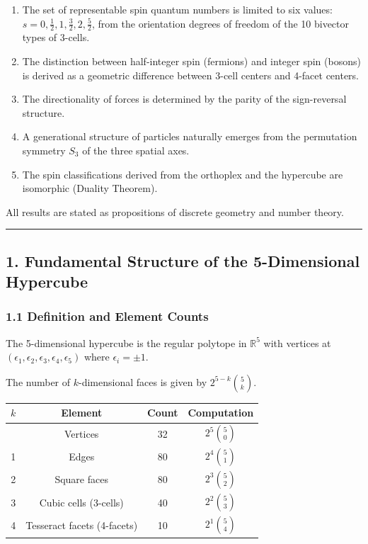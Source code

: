 \documentclass[a4paper,11pt]{article}
\providecommand{\tightlist}{\setlength{\itemsep}{0pt}\setlength{\parskip}{0pt}}
\newcounter{none}
\begin{document}
\begin{enumerate}
\def\labelenumi{\arabic{enumi}.}
\tightlist
\item
  The set of representable spin quantum numbers is limited to six values:
  $s = 0, \frac{1}{2}, 1, \frac{3}{2}, 2, \frac{5}{2}$, from the orientation degrees of freedom of the 10 bivector types of 3-cells.
\item
  The distinction between half-integer spin (fermions) and integer spin (bosons) is derived as a geometric difference between 3-cell centers and 4-facet centers.
\item
  The directionality of forces is determined by the parity of the sign-reversal structure.
\item
  A generational structure of particles naturally emerges from the permutation symmetry $S_3$ of the three spatial axes.
\item
  The spin classifications derived from the orthoplex and the hypercube are isomorphic (Duality Theorem).
\end{enumerate}

All results are stated as propositions of discrete geometry and number theory.

\begin{center}\rule{0.5\linewidth}{0.5pt}\end{center}

\subsection*{1. Fundamental Structure of the 5-Dimensional Hypercube}

\subsubsection*{1.1 Definition and Element Counts}

The 5-dimensional hypercube is the regular polytope in $\mathbb{R}^5$ with vertices at $(\epsilon_1, \epsilon_2, \epsilon_3, \epsilon_4, \epsilon_5)$ where $\epsilon_i = \pm 1$.

The number of $k$-dimensional faces is given by $2^{5-k}\binom{5}{k}$.

{\def\LTcaptype{none}
\begin{longtable}[]{@{}cccc@{}}
\toprule
$k$ & Element & Count & Computation \\
\midrule
\endhead
\bottomrule
\endlastfoot
0 & Vertices & 32 & $2^5 \binom{5}{0}$ \\
1 & Edges & 80 & $2^4 \binom{5}{1}$ \\
2 & Square faces & 80 & $2^3 \binom{5}{2}$ \\
3 & Cubic cells (3-cells) & 40 & $2^2 \binom{5}{3}$ \\
4 & Tesseract facets (4-facets) & 10 & $2^1 \binom{5}{4}$ \\
\end{longtable}
}
\end{document}
